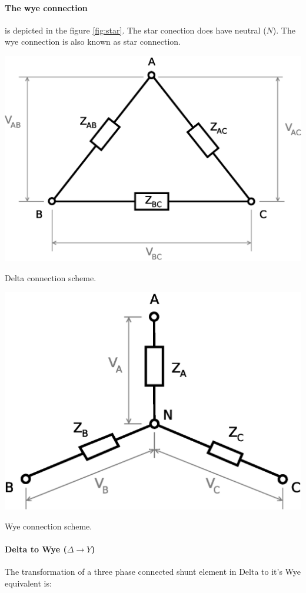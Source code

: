 \documentclass{tufte-book}
\begin{document}
\paragraph{The wye connection} is depicted in the figure \ref{fig:star}. The star conection does have neutral ($N$). The wye connection is also known as star connection.

\begin{marginfigure}
  \includegraphics[width=0.9\linewidth]{img/Delta.eps}
  \caption{Delta connection scheme.}
  \label{fig:delta}
\end{marginfigure}

\begin{marginfigure}
  \includegraphics[width=0.9\linewidth]{img/Star.eps}
  \caption{Wye connection scheme.}
  \label{fig:star}
\end{marginfigure}

\paragraph{Delta to Wye ($\Delta \rightarrow Y$)} The transformation of a three phase connected shunt element in Delta to it's Wye equivalent is:
\end{document}

